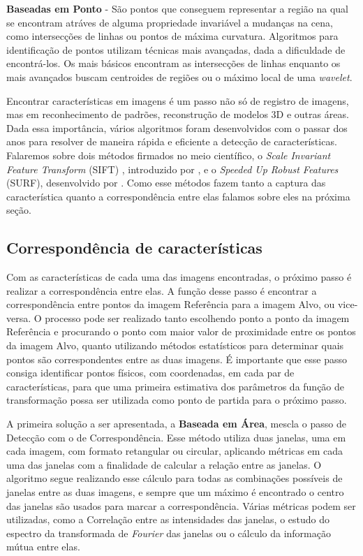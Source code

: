 \textbf{Baseadas em Ponto} - São pontos que conseguem representar a região na qual se encontram atráves de alguma 
propriedade invariável a mudanças na cena, como intersecções de linhas ou pontos de máxima curvatura. Algoritmos para 
identificação de pontos utilizam técnicas mais avançadas, dada a dificuldade de encontrá-los. Os mais básicos encontram 
as intersecções de linhas enquanto os mais avançados buscam centroides de regiões ou o máximo local de uma 
\textit{wavelet}.

  Encontrar características em imagens é um passo não só de registro de imagens, mas em reconhecimento de padrões, 
reconstrução de modelos 3D e outras áreas. Dada essa importância, vários algoritmos foram desenvolvidos com o passar dos
anos para resolver de maneira rápida e eficiente a detecção de características. Falaremos sobre dois métodos firmados 
no meio científico, o \textit{Scale Invariant Feature Transform} (SIFT) , introduzido por \cite{lowe2004distinctive}, e 
o \textit{Speeded Up Robust Features} (SURF), desenvolvido por \cite{bay2008speeded}. Como esse métodos fazem tanto a 
captura das característica quanto a correspondência entre elas falamos sobre eles na próxima seção.

\subsection{Correspondência de características}

    Com as características de cada uma das imagens encontradas, o próximo passo é realizar a correspondência entre elas.
A função desse passo é encontrar a correspondência entre pontos da imagem Referência para a imagem Alvo, ou vice-versa. 
O processo pode ser realizado tanto escolhendo ponto a ponto da imagem Referência e procurando o ponto com maior valor 
de proximidade entre os pontos da imagem Alvo, quanto utilizando métodos estatísticos para determinar quais pontos são 
correspondentes entre as duas imagens. É importante que esse passo consiga identificar pontos físicos, com coordenadas, 
em cada par de características, para que uma primeira estimativa dos parâmetros da função de transformação possa ser 
utilizada como ponto de partida para o próximo passo.

    A primeira solução a ser apresentada, a \textbf{Baseada em Área}, mescla o passo de Detecção com o de 
Correspondência. Esse método utiliza duas janelas, uma em cada imagem, com formato retangular ou circular, aplicando
métricas em cada uma das janelas com a finalidade de calcular a relação entre as janelas. O algoritmo segue realizando
esse cálculo para todas as combinações possíveis de janelas entre as duas imagens, e sempre que um máximo é encontrado
o centro das janelas são usados para marcar a correspondência. Várias métricas podem ser utilizadas, como a 
Correlação entre as intensidades das janelas, o estudo do espectro da transformada de \textit{Fourier} das janelas ou 
o cálculo da informação mútua entre elas.

